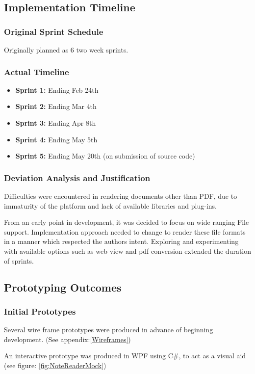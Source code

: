 \subsection{Implementation Timeline}
\subsubsection{Original Sprint Schedule}
Originally planned as 6 two week sprints. 
\subsubsection{Actual Timeline}
\begin{itemize}
    \item \textbf{Sprint 1:} Ending Feb 24th
    \item \textbf{Sprint 2:} Ending Mar 4th
    \item \textbf{Sprint 3:} Ending Apr 8th
    \item \textbf{Sprint 4:} Ending May 5th
    \item \textbf{Sprint 5:} Ending May 20th (on submission of source code)
\end{itemize}

\subsubsection{Deviation Analysis and Justification}
Difficulties were encountered in rendering documents other than PDF, due to immaturity of the platform and lack of available libraries and plug-ins. 

From an early point in development, it was decided to focus on wide ranging File support. Implementation approach needed to change to render these file formats in a manner which respected the authors intent. Exploring and experimenting with available options such as web view and pdf conversion extended the duration of sprints. 

\subsection{Prototyping Outcomes}
\subsubsection{Initial Prototypes}
Several wire frame prototypes were produced in advance of beginning development.  (See appendix:\ref{Wireframes})

An interactive prototype was produced in WPF using C\#, to act as a visual aid (see figure: \ref{fig:NoteReaderMock})

